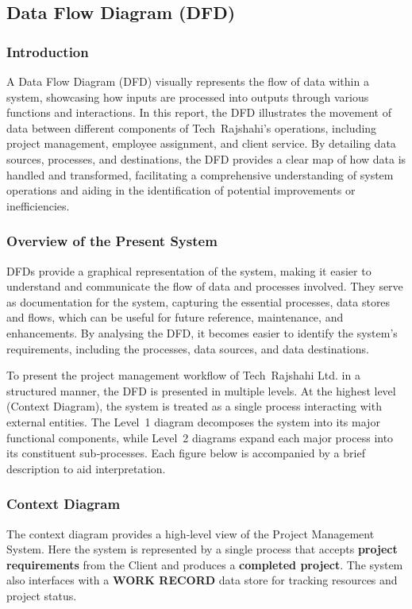 \documentclass[12pt,a4paper]{article}
\newcommand{\tech}[1]{#1}
\newcommand{\company}[1]{#1}
\begin{document}
\subsection{Data Flow Diagram (DFD)}
\subsubsection{Introduction}
A Data Flow Diagram (DFD) visually represents the flow of data within a system, showcasing how inputs are processed into outputs through various functions and interactions.  In this report, the DFD illustrates the movement of data between different components of Tech Rajshahi’s operations, including project management, employee assignment, and client service.  By detailing data sources, processes, and destinations, the DFD provides a clear map of how data is handled and transformed, facilitating a comprehensive understanding of system operations and aiding in the identification of potential improvements or inefficiencies.

\subsubsection{Overview of the Present System}
DFDs provide a graphical representation of the system, making it easier to understand and communicate the flow of data and processes involved.  They serve as documentation for the system, capturing the essential processes, data stores and flows, which can be useful for future reference, maintenance, and enhancements.  By analysing the DFD, it becomes easier to identify the system’s requirements, including the processes, data sources, and data destinations.

To present the project management workflow of \company{Tech Rajshahi Ltd.} in a structured manner, the DFD is presented in multiple levels.  At the highest level (Context Diagram), the system is treated as a single process interacting with external entities.  The Level~1 diagram decomposes the system into its major functional components, while Level~2 diagrams expand each major process into its constituent sub‑processes.  Each figure below is accompanied by a brief description to aid interpretation.

\subsubsection{Context Diagram}
\noindent
The context diagram provides a high‑level view of the \tech{Project Management System}.  Here the system is represented by a single process that accepts \textbf{project requirements} from the \company{Client} and produces a \textbf{completed project}.  The system also interfaces with a \textbf{WORK RECORD} data store for tracking resources and project status.
\end{document}
